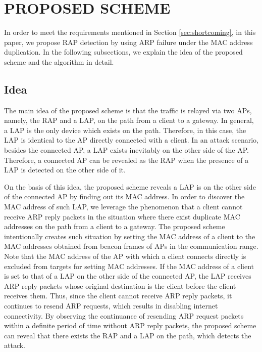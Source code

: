 \documentclass[conference]{IEEEtran}
\begin{document}
\section{PROPOSED SCHEME}\label{sec:4}
In order to meet the requirements mentioned in Section \ref{sec:shortcoming}, in this paper, we propose RAP detection by using ARP failure under the MAC address duplication.
In the following subsections, we explain the idea of the proposed scheme and the algorithm in detail.

\subsection{Idea}
The main idea of the proposed scheme is that the traffic is relayed via two APs, namely, the RAP and a LAP, on the path from a client to a gateway.
In general, a LAP is the only device which exists on the path.
Therefore, in this case, the LAP is identical to the AP directly connected with a client.
In an attack scenario, besides the connected AP, a LAP exists inevitably on the other side of the AP.
Therefore, a connected AP can be revealed as the RAP when the presence of a LAP is detected on the other side of it.

On the basis of this idea, the proposed scheme reveals a LAP is on the other side of the connected AP by finding out its MAC address.
In order to discover the MAC address of such LAP, we leverage the phenomenon that a client cannot receive ARP reply packets in the situation where there exist duplicate MAC addresses on the path from a client to a gateway.
The proposed scheme intentionally creates such situation by setting the MAC address of a client to the MAC addresses obtained from beacon frames of APs in the communication range.
Note that the MAC address of the AP with which a client connects directly is excluded from targets for setting MAC addresses.
If the MAC address of a client is set to that of a LAP on the other side of the connected AP, the LAP receives ARP reply packets whose original destination is the client before the client receives them.
Thus, since the client cannot receive ARP reply packets, it continues to resend ARP requests, which results in disabling internet connectivity.
By observing the continuance of resending ARP request packets within a definite period of time without ARP reply packets, the proposed scheme can reveal that there exists the RAP and a LAP on the path, which detects the attack. %
\end{document}

